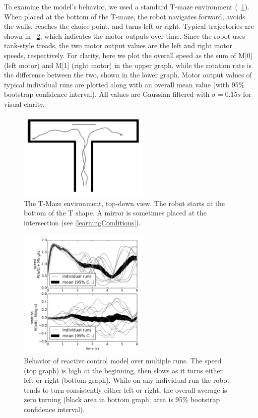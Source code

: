 \documentclass[conference]{IEEEtran}
\begin{document}
To examine the model's behavior, we used a standard T-maze
environment (\figurename~\ref{Tmaze}). When placed at the bottom
of the T-maze, the robot navigates forward, avoids the
walls, reaches the choice point, and turns left or right.
Typical trajectories are shown in \figurename~\ref{React}, which indicates
the motor outputs over time. Since the robot uses tank-style treads, the 
two motor output values are the left and right motor speeds, respectively. 
For clarity, here we plot the overall speed as the sum of M[0] (left motor) 
and M[1] (right motor) in the upper graph, while the rotation rate is the difference between the two,
shown in the lower graph. 
Motor output values of typical individual runs are plotted along with an overall 
mean value (with 95\% bootstrap confidence interval). All values are Gaussian 
filtered with $\sigma=0.15s$ for visual clarity.

\begin{figure}[!t]
\centering
\includegraphics[width=2.5in]{tmazeRev.pdf}
\caption{The T-Maze environment, top-down view. The robot starts at the bottom of the T shape.
A mirror is sometimes placed at the intersection (see \ref{learningConditions}).}
\label{Tmaze}
\end{figure}


\begin{figure}[!t]
\centering
\includegraphics[width=2.5in]{basic/basic.png}
\caption{Behavior of reactive control model over multiple runs. The speed (top graph) is high at the beginning, then slows as it turns either left or right (bottom graph). While on any individual run the robot tends to turn consistently either left or right, the overall average is zero turning (black area in bottom graph; area is 95\% bootstrap confidence interval).}
\label{React}
\end{figure}
\end{document}
